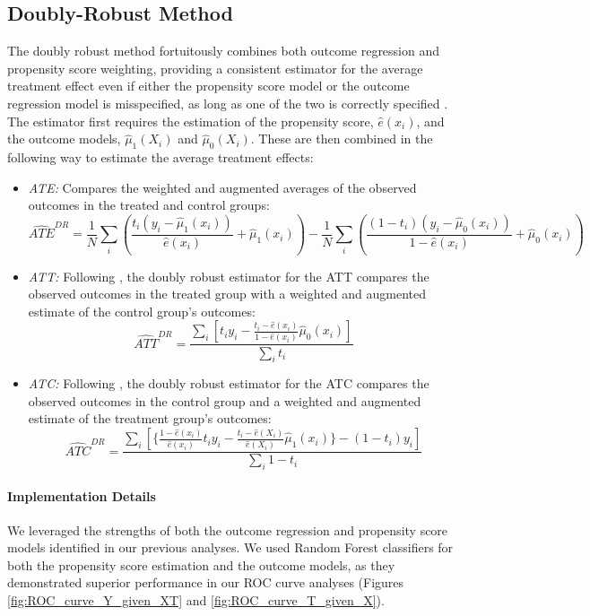 \documentclass{article}
\newcommand{\gur}[1]{{\color{teal}{Gur: #1}}}
\begin{document}
\gur{Bootstrap}



\subsection{Doubly-Robust Method}

The doubly robust method fortuitously combines both outcome regression and propensity score weighting, providing a consistent estimator for the average treatment effect even if either the propensity score model or the outcome regression model is misspecified, as long as one of the two is correctly specified \citep{bang2005doubly}. The estimator first requires the estimation of the propensity score, $\hat{e}(x_i)$, and the outcome models, $\hat{\mu}_1(X_i)$ and $\hat{\mu}_0(X_i)$. These are then combined in the following way to estimate the average treatment effects:

\gur{Add explanation of augmentation?}

\begin{itemize}
    \item \textit{ATE:} Compares the weighted and augmented averages of the observed outcomes in the treated and control groups:
    \[
    \widehat{ATE}^{DR} = \frac{1}{N} \sum_i \left( \frac{t_i (y_i - \hat{\mu}_1(x_i))}{\hat{e}(x_i)} + \hat{\mu}_1(x_i) \right) - \frac{1}{N} \sum_i \left( \frac{(1 - t_i)(y_i - \hat{\mu}_0(x_i))}{1 - \hat{e}(x_i)} + \hat{\mu}_0(x_i) \right)
    \]
    
    \item \textit{ATT:} Following \citet{tao2019doubly}, the doubly robust estimator for the ATT compares the observed outcomes in the treated group with a weighted and augmented estimate of the control group's outcomes: 
    \[
    \widehat{ATT}^{DR} = \frac{\sum_i \left[ t_i y_i - \frac{ t_i - \hat{e}(x_i)}{1 - \hat{e}(x_i)} \hat{\mu}_0(x_i) \right]}{\sum_i t_i}
    \]
    
    \item \textit{ATC:} Following \citet{tao2019doubly}, the doubly robust estimator for the ATC compares the observed outcomes in the control group and a weighted and augmented estimate of the treatment group's outcomes:
    \[
    \widehat{ATC}^{DR} = \frac{\sum_i \left[ \{ \frac{ 1 - \hat{e}(x_i)}{\hat{e}(x_i)} t_i y_i - \frac{ t_i - \hat{e}(X_i)}{\hat{e}(X_i)} \hat{\mu}_1(x_i) \}   - (1-t_i)y_i \right]}{\sum_i 1 - t_i}
    \]
\end{itemize}

\paragraph{Implementation Details} We leveraged the strengths of both the outcome regression and propensity score models identified in our previous analyses. We used Random Forest classifiers for both the propensity score estimation and the outcome models, as they demonstrated superior performance in our ROC curve analyses (Figures \ref{fig:ROC_curve_Y_given_XT} and \ref{fig:ROC_curve_T_given_X}).
\end{document}
